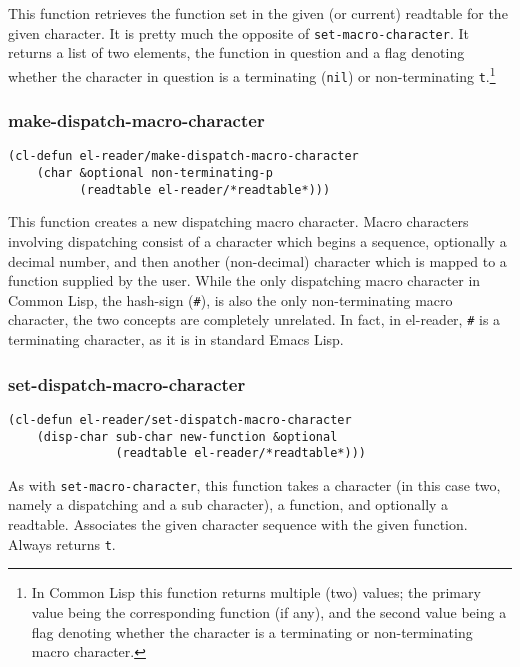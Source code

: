 \documentclass[a4paper,10pt,twoside]{report}
\newcommand{\el}{Emacs Lisp}
\newcommand{\cl}{Common Lisp}
\newcommand{\elr}{el-reader}
\newcommand{\sym}[1]{\texttt{#1}}
\newcommand{\fun}[1]{\texttt{#1}}
\newcommand{\nil}{\sym{nil}}
\newcommand{\tee}{\sym{t}}
\begin{document}
This function retrieves the function set in the given (or current) readtable for
the given character.  It is pretty much the opposite of
\fun{set-macro-character}.  It returns a list of two elements, the function in
question and a flag denoting whether the character in question is a terminating
(\nil{}) or non-terminating \tee{}.\footnote{In \cl{} this function returns
  multiple (two) values; the primary value being the corresponding function (if
  any), and the second value being a flag denoting whether the character is a
  terminating or non-terminating macro character.}

\subsubsection{make-dispatch-macro-character}
\label{subsubsec:make-dispatch-macro-character}

\begin{lstlisting}[style=lispinline]
(cl-defun el-reader/make-dispatch-macro-character
    (char &optional non-terminating-p
          (readtable el-reader/*readtable*)))
\end{lstlisting}

This function creates a new dispatching macro character.  Macro characters
involving dispatching consist of a character which begins a sequence, optionally
a decimal number, and then another (non-decimal) character which is mapped to a
function supplied by the user.  While the only dispatching macro character in
\cl{}, the hash-sign (\texttt{\#}), is also the only non-terminating macro
character, the two concepts are completely unrelated.  In fact, in \elr{},
\texttt{\#} is a terminating character, as it is in standard \el{}.

\subsubsection{set-dispatch-macro-character}
\label{subsubsec:set-dispatch-macro-character}

\begin{lstlisting}[style=lispinline]
(cl-defun el-reader/set-dispatch-macro-character
    (disp-char sub-char new-function &optional
               (readtable el-reader/*readtable*)))
\end{lstlisting}

As with \fun{set-macro-character}, this function takes a character (in this case
two, namely a dispatching and a sub character), a function, and optionally a
readtable.  Associates the given character sequence with the given function.
Always returns \tee{}.
\end{document}
